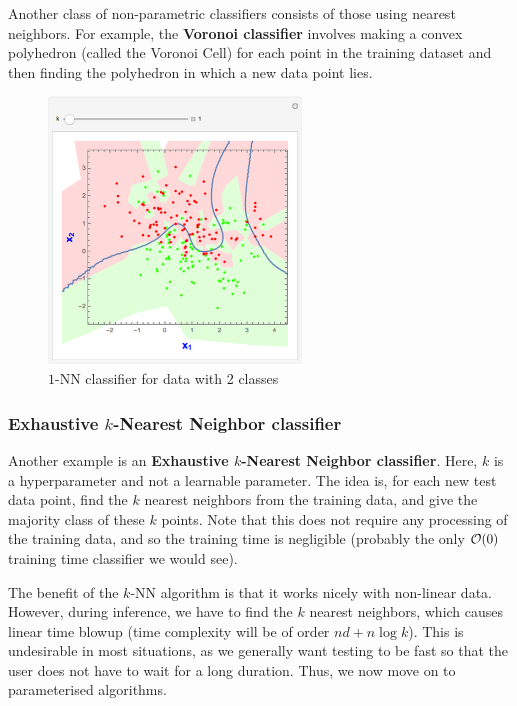 \documentclass[12pt]{article}
\begin{document}
Another class of non-parametric classifiers consists of those using nearest neighbors. For example, the {\bf Voronoi classifier} involves making a convex polyhedron (called the Voronoi Cell) for each point in the training dataset and then finding the polyhedron in which a new data point lies.
\begin{figure}[h]
    \begin{center}
        \includegraphics[width=0.6\textwidth]{knn.png}
        \caption{$1$-NN classifier for data with 2 classes}
        \label{fig:knn}
    \end{center}
\end{figure}
\subsubsection{{ Exhaustive $k$-Nearest Neighbor classifier}}


Another example is an {\bf Exhaustive $k$-Nearest Neighbor classifier}. Here, $k$ is a hyperparameter and not a learnable parameter. The idea is, for each new test data point, find the $k$ nearest neighbors from the training data, and give the majority class of these $k$ points. Note that this does not require any processing of the training data, and so the training time is negligible (probably the only ${\cal O}(0)$ training time classifier we would see).

The benefit of the $k$-NN algorithm is that it works nicely with non-linear data. However, during inference, we have to find the $k$ nearest neighbors, which causes linear time blowup (time complexity will be of order $nd+n\log k$). This is undesirable in most situations, as we generally want testing to be fast so that the user does not have to wait for a long duration. Thus, we now move on to parameterised algorithms.
\end{document}
